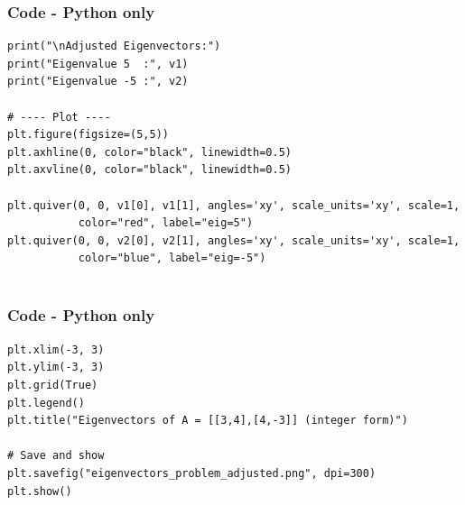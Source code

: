 \documentclass{beamer}
\theoremstyle{remark}
\numberwithin{equation}{section}
\begin{document}
\begin{frame}[fragile]
\frametitle{Code - Python only}
\begin{lstlisting}
print("\nAdjusted Eigenvectors:")
print("Eigenvalue 5  :", v1)
print("Eigenvalue -5 :", v2)

# ---- Plot ----
plt.figure(figsize=(5,5))
plt.axhline(0, color="black", linewidth=0.5)
plt.axvline(0, color="black", linewidth=0.5)

plt.quiver(0, 0, v1[0], v1[1], angles='xy', scale_units='xy', scale=1,
           color="red", label="eig=5")
plt.quiver(0, 0, v2[0], v2[1], angles='xy', scale_units='xy', scale=1,
           color="blue", label="eig=-5")


\end{lstlisting}
\end{frame}

\begin{frame}[fragile]
\frametitle{Code - Python only}
\begin{lstlisting}
plt.xlim(-3, 3)
plt.ylim(-3, 3)
plt.grid(True)
plt.legend()
plt.title("Eigenvectors of A = [[3,4],[4,-3]] (integer form)")

# Save and show
plt.savefig("eigenvectors_problem_adjusted.png", dpi=300)
plt.show()




\end{lstlisting}
\end{frame}
\end{document}
